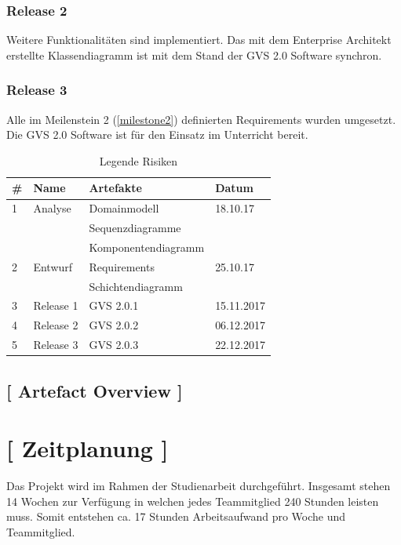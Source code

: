 \documentclass[11pt,a4paper,english,oneside]{book}
\numberwithin{equation}{chapter}
\begin{document}
	\subsubsection{Release 2}
	Weitere Funktionalitäten sind implementiert. Das mit dem Enterprise Architekt erstellte Klassendiagramm ist mit dem Stand der GVS 2.0 Software synchron.
	
	\subsubsection{Release 3}
	Alle im Meilenstein 2 (\ref{milestone2}) definierten Requirements wurden umgesetzt. Die GVS 2.0 Software ist für den Einsatz im Unterricht bereit.
	
	\begin{table}[h!]
		\centering
		\begin{tabular}{l l l l}
			\toprule 
			\# & Name & Artefakte & Datum \\
			\toprule 
			1 & Analyse & Domainmodell & 18.10.17 \\
			& & Sequenzdiagramme & \\
			& &  Komponentendiagramm & \\
			\midrule
			2 & Entwurf  & Requirements & 25.10.17\\
			& & Schichtendiagramm & \\
			\midrule
			3 & Release 1 & GVS 2.0.1 & 15.11.2017 \\
			\midrule
			4 & Release 2 & GVS 2.0.2 & 06.12.2017 \\
			\midrule
			5 & Release 3 & GVS 2.0.3 & 22.12.2017 \\
			
			\bottomrule 
		\end{tabular} 
		\caption{Legende Risiken} 
	\end{table}
	
	\subsection{[ Artefact Overview ]}

	
	
	\section{ [ Zeitplanung ] }
	
	Das Projekt wird im Rahmen der Studienarbeit durchgeführt. Insgesamt stehen 14 Wochen zur Verfügung in welchen jedes Teammitglied 240 Stunden leisten muss. Somit entstehen ca. 17 Stunden Arbeitsaufwand pro Woche und Teammitglied.
		
\end{document}
